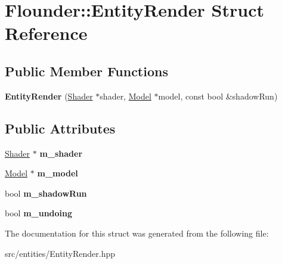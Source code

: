\hypertarget{struct_flounder_1_1_entity_render}{}\section{Flounder\+:\+:Entity\+Render Struct Reference}
\label{struct_flounder_1_1_entity_render}
\subsection*{Public Member Functions}
\begin{DoxyCompactItemize}
\item 
\mbox{\label{struct_flounder_1_1_entity_render_ad684286441c6903079b7520b6676b6ba}} 
{\bfseries Entity\+Render} (\hyperlink{class_flounder_1_1_shader}{Shader} $\ast$shader, \hyperlink{class_flounder_1_1_model}{Model} $\ast$model, const bool \&shadow\+Run)
\end{DoxyCompactItemize}
\subsection*{Public Attributes}
\begin{DoxyCompactItemize}
\item 
\mbox{\label{struct_flounder_1_1_entity_render_ac89a48493f84071a0769d882c509e4aa}} 
\hyperlink{class_flounder_1_1_shader}{Shader} $\ast$ {\bfseries m\+\_\+shader}
\item 
\mbox{\label{struct_flounder_1_1_entity_render_a35620523e2e1cec433f9d843e029fed7}} 
\hyperlink{class_flounder_1_1_model}{Model} $\ast$ {\bfseries m\+\_\+model}
\item 
\mbox{\label{struct_flounder_1_1_entity_render_a855a95b5c16c9345237c689202408486}} 
bool {\bfseries m\+\_\+shadow\+Run}
\item 
\mbox{\label{struct_flounder_1_1_entity_render_a384e6f801685d5f4e67bfbb3d9c6a497}} 
bool {\bfseries m\+\_\+undoing}
\end{DoxyCompactItemize}


The documentation for this struct was generated from the following file\+:\begin{DoxyCompactItemize}
\item 
src/entities/Entity\+Render.\+hpp\end{DoxyCompactItemize}

